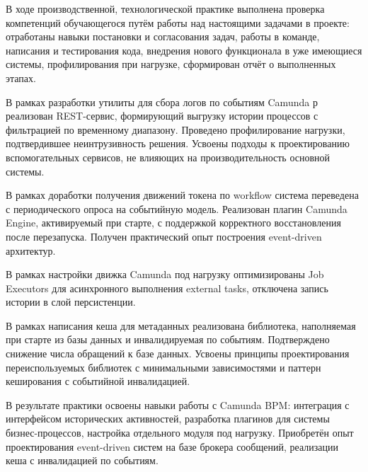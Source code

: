 
В ходе производственной, технологической практике выполнена проверка компетенций обучающегося путём работы над настоящими задачами в проекте: 
отработаны навыки постановки и согласования задач, работы в команде, написания и тестирования кода, внедрения нового функционала в уже имеющиеся системы, профилирования при нагрузке, сформирован отчёт о выполненных этапах.

В рамках разработки утилиты для сбора логов по событиям Camunda р
реализован REST-сервис, формирующий выгрузку истории процессов с фильтрацией по временному диапазону. 
Проведено профилирование нагрузки, подтвердившее неинтрузивность решения. 
Усвоены подходы к проектированию вспомогательных сервисов, не влияющих на производительность основной системы.

В рамках доработки получения движений токена по workflow система 
переведена с периодического опроса на событийную модель. 
Реализован плагин Camunda Engine, активируемый при старте, с поддержкой корректного восстановления после перезапуска. 
Получен практический опыт построения event-driven архитектур.

В рамках настройки движка Camunda под нагрузку оптимизированы Job
Executors для асинхронного выполнения external tasks, отключена 
запись истории в слой персистенции.

В рамках написания кеша для метаданных реализована библиотека, наполняемая при старте из базы данных и инвалидируемая по событиям. 
Подтверждено снижение числа обращений к базе данных. Усвоены принципы проектирования переиспользуемых библиотек с минимальными зависимостями и паттерн кеширования с событийной инвалидацией.

В результате практики освоены навыки работы с Camunda BPM: интеграция с интерфейсом исторических активностей,
разработка плагинов для системы бизнес-процессов,      
настройка отдельного модуля под
нагрузку. Приобретён опыт        
проектирования event-driven
систем на базе брокера сообщений,
реализации кеша с инвалидацией по событиям.